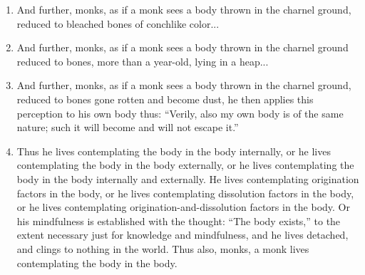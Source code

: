 \begin{enumerate}[resume]
\item And further, monks, as if a monk sees a body thrown in the charnel ground, reduced to bleached bones of conchlike color...
\item And further, monks, as if a monk sees a body thrown in the charnel ground reduced to bones, more than a year-old, lying in a heap...
\item And further, monks, as if a monk sees a body thrown in the charnel ground, reduced to bones gone rotten and become dust, he then applies this perception to his own body thus: “Verily, also my own body is of the same nature; such it will become and will not escape it.”
\item Thus he lives contemplating the body in the body internally, or he lives contemplating the body in the body externally, or he lives contemplating the body in the body internally and externally. He lives contemplating origination factors in the body, or he lives contemplating dissolution factors in the body, or he lives contemplating origination-and-dissolution factors in the body. Or his mindfulness is established with the thought: “The body exists,” to the extent necessary just for knowledge and mindfulness, and he lives detached, and clings to nothing in the world. Thus also, monks, a monk lives contemplating the body in the body.
\end{enumerate}

